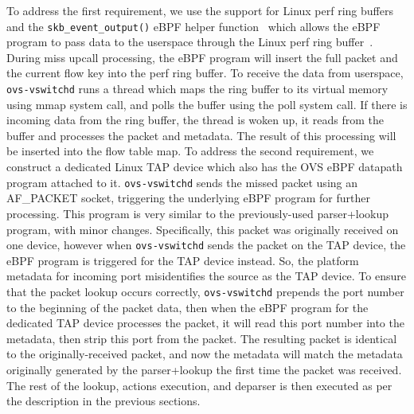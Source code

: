 \documentclass[10pt,numbers,reprint]{sigplanconf}
\begin{document}
To address the first requirement, we use the support for Linux perf ring
buffers and the \verb+skb_event_output()+ eBPF helper function~\cite{ebpfperf}
which allows the eBPF program to pass data to the userspace through the Linux perf
ring buffer~\cite{ebpfperf}.  During miss upcall processing, the eBPF program
will insert the full packet and the current flow key into the perf ring buffer.
To receive the data from userspace, \verb+ovs-vswitchd+ runs a thread which
maps the ring buffer to its virtual memory using mmap system call, and polls
the buffer using the poll system call. If there is incoming data from the ring buffer, the
thread is woken up, it reads from the buffer and processes the packet and
metadata. The result of this processing will be inserted into the flow table
map.
To address the second requirement, we construct a dedicated Linux TAP device
which also has the OVS eBPF datapath program attached to it.
\verb+ovs-vswitchd+ sends the missed packet using an AF\_PACKET socket,
triggering the underlying eBPF program for further processing.
This program is very similar to the
previously-used parser+lookup program, with minor changes. Specifically, this
packet was originally received on one device, however when \verb+ovs-vswitchd+
sends the packet on the TAP device, the eBPF program is triggered for the TAP
device instead. So, the platform metadata for incoming port misidentifies the
source as the TAP device. To ensure that the packet lookup occurs correctly,
\verb+ovs-vswitchd+ prepends the port number to the beginning of the packet
data, then when the eBPF program for the dedicated TAP device processes the
packet, it will read this port number into the metadata, then strip this port
from the packet. The resulting packet is identical to the originally-received
packet, and now the metadata will match the metadata originally generated by
the parser+lookup the first time the packet was received. The rest of the
lookup, actions execution, and deparser is then executed as per the description
in the previous sections.
\end{document}
